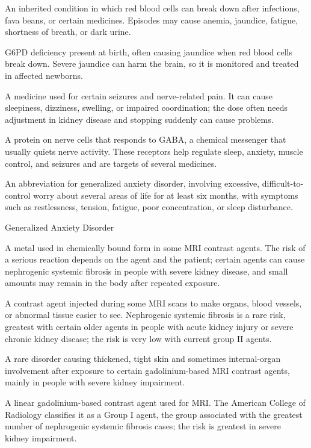  An inherited condition in which red blood cells can break down after infections, fava beans, or certain medicines. Episodes may cause anemia, jaundice, fatigue, shortness of breath, or dark urine.

 G6PD deficiency present at birth, often causing jaundice when red blood cells break down. Severe jaundice can harm the brain, so it is monitored and treated in affected newborns.

 A medicine used for certain seizures and nerve-related pain. It can cause sleepiness, dizziness, swelling, or impaired coordination; the dose often needs adjustment in kidney disease and stopping suddenly can cause problems.

 A protein on nerve cells that responds to GABA, a chemical messenger that usually quiets nerve activity. These receptors help regulate sleep, anxiety, muscle control, and seizures and are targets of several medicines.

 An abbreviation for generalized anxiety disorder, involving excessive, difficult-to-control worry about several areas of life for at least six months, with symptoms such as restlessness, tension, fatigue, poor concentration, or sleep disturbance.

\synonyms
Generalized Anxiety Disorder

 A metal used in chemically bound form in some MRI contrast agents. The risk of a serious reaction depends on the agent and the patient; certain agents can cause nephrogenic systemic fibrosis in people with severe kidney disease, and small amounts may remain in the body after repeated exposure.

 A contrast agent injected during some MRI scans to make organs, blood vessels, or abnormal tissue easier to see. Nephrogenic systemic fibrosis is a rare risk, greatest with certain older agents in people with acute kidney injury or severe chronic kidney disease; the risk is very low with current group II agents.

 A rare disorder causing thickened, tight skin and sometimes internal-organ involvement after exposure to certain gadolinium-based MRI contrast agents, mainly in people with severe kidney impairment.

 A linear gadolinium-based contrast agent used for MRI. The American College of Radiology classifies it as a Group I agent, the group associated with the greatest number of nephrogenic systemic fibrosis cases; the risk is greatest in severe kidney impairment.

